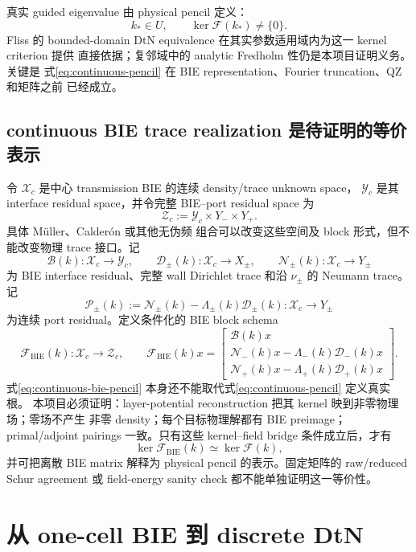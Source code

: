 \documentclass[UTF8,fontset=fandol,11pt,a4paper]{ctexart}
\newcommand{\cF}{\mathcal F}
\newcommand{\cB}{\mathcal B}
\newcommand{\cD}{\mathcal D}
\newcommand{\cN}{\mathcal N}
\newcommand{\cP}{\mathcal P}
\begin{document}
真实 guided eigenvalue 由 physical pencil 定义：
\begin{equation}
  k_*\in U,
  \qquad
  \ker\cF(k_*)\ne\{0\}.
  \label{eq:true-root}
\end{equation}
Fliss 的 bounded-domain DtN equivalence 在其实参数适用域内为这一 kernel criterion 提供
直接依据；复邻域中的 analytic Fredholm 性仍是本项目证明义务。关键是
式\eqref{eq:continuous-pencil} 在 BIE representation、Fourier truncation、QZ 和矩阵之前
已经成立。

\subsection{continuous BIE trace realization 是待证明的等价表示}

令 $\mathcal X_c$ 是中心 transmission BIE 的连续 density/trace unknown space，
$\mathcal Y_c$ 是其 interface residual space，并令完整 BIE--port residual space 为
\[
  \mathcal Z_c:=\mathcal Y_c\times Y_-\times Y_+.
\]
具体 M\"uller、Calder\'on 或其他无伪频
组合可以改变这些空间及 block 形式，但不能改变物理 trace 接口。记
\[
  \cB(k):\mathcal X_c\to\mathcal Y_c,
  \qquad
  \cD_\pm(k):\mathcal X_c\to X_\pm,
  \qquad
  \cN_\pm(k):\mathcal X_c\to Y_\pm
\]
为 BIE interface residual、完整 wall Dirichlet trace 和沿 $\nu_\pm$ 的 Neumann trace。
记
\[
  \cP_\pm(k):=\cN_\pm(k)-\Lambda_\pm(k)\cD_\pm(k):
  \mathcal X_c\longrightarrow Y_\pm
\]
为连续 port residual。定义条件化的 BIE block schema
\begin{equation}
  \cF_{\mathrm{BIE}}(k):\mathcal X_c\longrightarrow\mathcal Z_c,
  \qquad
  \cF_{\mathrm{BIE}}(k)x=
  \begin{bmatrix}
    \cB(k)x\\
    \cN_-(k)x-\Lambda_-(k)\cD_-(k)x\\
    \cN_+(k)x-\Lambda_+(k)\cD_+(k)x
  \end{bmatrix}.
  \label{eq:continuous-bie-pencil}
\end{equation}
式\eqref{eq:continuous-bie-pencil} 本身还不能取代式\eqref{eq:continuous-pencil} 定义真实根。
本项目必须证明：layer-potential reconstruction 把其 kernel 映到非零物理场；零场不产生
非零 density；每个目标物理解都有 BIE preimage；primal/adjoint pairings 一致。只有这些
kernel--field bridge 条件成立后，才有
\[
  \ker\cF_{\mathrm{BIE}}(k)\simeq\ker\cF(k),
\]
并可把离散 BIE matrix 解释为 physical pencil 的表示。固定矩阵的 raw/reduced Schur
agreement 或 field-energy sanity check 都不能单独证明这一等价性。

\section{从 one-cell BIE 到 discrete DtN}
\end{document}
